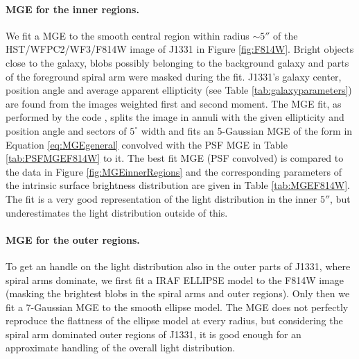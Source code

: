\paragraph{MGE for the inner regions.} We fit a MGE to the smooth central region within radius $\sim 5''$ of the HST/WFPC2/WF3/F814W image of J1331 in Figure \ref{fig:F814W}. Bright objects  close to the galaxy, blobs possibly belonging to the background galaxy and parts of the foreground spiral arm were masked during the fit. J1331's galaxy center, position angle and average apparent ellipticity (see Table \ref{tab:galaxyparameters}) are found from the images weighted first and second moment. The MGE fit, as performed by the code \cite{Cap02}, splits the image in annuli with the given ellipticity and position angle and sectors of $5^\circ$ width and fits an 5-Gaussian MGE of the form in Equation \ref{eq:MGEgeneral} convolved with the PSF MGE in Table \ref{tab:PSFMGEF814W} to it. The best fit MGE (PSF convolved) is compared to the data in Figure \ref{fig:MGEinnerRegions} and the corresponding parameters of the intrinsic surface brightness distribution are given in Table \ref{tab:MGEF814W}. The fit is a very good representation of the light distribution in the inner $5''$, but underestimates the light distribution outside of this.

\paragraph{MGE for the outer regions.} To get an handle on the light distribution also in the outer parts of J1331, where spiral arms dominate, we first fit a IRAF ELLIPSE  model to the F814W image (masking the brightest blobs in the spiral arms and outer regions). Only then we fit a 7-Gaussian MGE to the smooth ellipse model. The MGE does not perfectly reproduce the flattness of the ellipse model at every radius, but considering the spiral arm dominated outer regions of J1331, it is good enough for an approximate handling of the overall light distribution.

